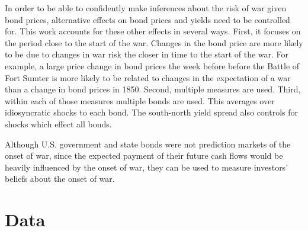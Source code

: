 In order to be able to confidently make inferences about the risk of war given bond prices, alternative effects on bond prices and yields need to be controlled for.
This work accounts for these other effects in several ways.
First, it focuses on the period close to the start of the war.
Changes in the bond price are more likely to be due to changes in war risk the closer in time to the start of the war.
For example, a large price change in bond prices the week before before the Battle of Fort Sumter is more likely to be related to changes in the expectation of a war than a change in bond prices in 1850.
Second, multiple measures are used.
Third, within each of those measures multiple bonds are used.
This averages over idiosyncratic shocks to each bond.
The south-north yield spread also controls for shocks which effect all bonds.

Although U.S. government and state bonds were not prediction markets of the onset of war, since the expected payment of their future cash flows would be heavily influenced by the onset of war, they can be used to measure investors' beliefs about the onset of war.

\section{Data}
\label{acw_onset:sec:data}

